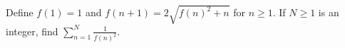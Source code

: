 Define $f(1) = 1$ and $f(n + 1) = 2\sqrt{f(n)^2 + n}$ for $n \ge 1$. If $N \ge
1$ is an integer, find $\displaystyle{\sum_{n=1}^{N} \frac{1}{f(n)^2}}$.

